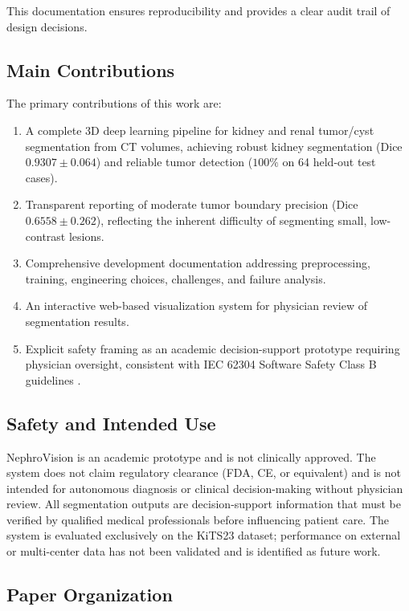 This documentation ensures reproducibility and provides a clear audit trail of design decisions.

\subsection{Main Contributions}

The primary contributions of this work are:
\begin{enumerate}
    \item A complete 3D deep learning pipeline for kidney and renal tumor/cyst segmentation from CT volumes, achieving robust kidney segmentation (Dice $0.9307 \pm 0.064$) and reliable tumor detection ($100\%$ on 64 held-out test cases).
    \item Transparent reporting of moderate tumor boundary precision (Dice $0.6558 \pm 0.262$), reflecting the inherent difficulty of segmenting small, low-contrast lesions.
    \item Comprehensive development documentation addressing preprocessing, training, engineering choices, challenges, and failure analysis.
    \item An interactive web-based visualization system for physician review of segmentation results.
    \item Explicit safety framing as an academic decision-support prototype requiring physician oversight, consistent with IEC 62304 Software Safety Class B guidelines \cite{iec62304}.
\end{enumerate}

\subsection{Safety and Intended Use}

NephroVision is an academic prototype and is not clinically approved. The system does not claim regulatory clearance (FDA, CE, or equivalent) and is not intended for autonomous diagnosis or clinical decision-making without physician review. All segmentation outputs are decision-support information that must be verified by qualified medical professionals before influencing patient care. The system is evaluated exclusively on the KiTS23 dataset; performance on external or multi-center data has not been validated and is identified as future work.

\subsection{Paper Organization}

